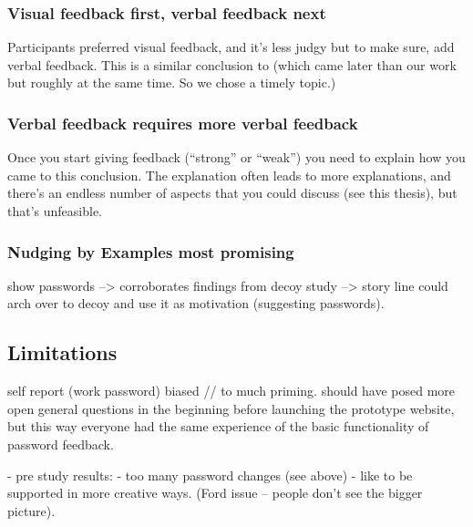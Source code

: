 \subsubsection{Visual feedback first, verbal feedback next}
Participants preferred visual feedback, and it's less judgy but to make sure, add verbal feedback. This is a similar conclusion to \cite{Ur2017DataDrivenPWMeter} (which came later than our work but roughly at the same time. So we chose a timely topic.)

\subsubsection{Verbal feedback requires more verbal feedback}
Once you start giving feedback (``strong'' or ``weak'') you need to explain how you came to this conclusion. The explanation often leads to more explanations, and there's an endless number of aspects that you could discuss (see this thesis), but that's unfeasible. 


\subsubsection{Nudging by Examples most promising}
show passwords --> corroborates findings from decoy study --> story line could arch over to decoy and use it as motivation (suggesting passwords). 



\subsection{Limitations}
self report (work password) 
biased // to much priming. should have posed more open general questions in the beginning before launching the prototype website, but this way everyone had the same experience of the basic functionality of password feedback. 

- pre study results:
- too many password changes (see above)
- like to be supported in more creative ways. (Ford issue -- people don't see the bigger picture).



